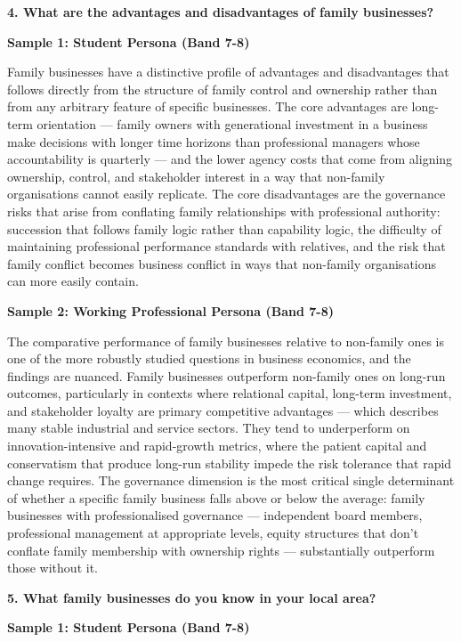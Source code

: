\separator

\begin{ieltsquestion}
\textbf{4. What are the advantages and disadvantages of family businesses?}
\end{ieltsquestion}
\textbf{Sample 1: Student Persona (Band 7-8)}

Family businesses have a distinctive profile of advantages and disadvantages that follows directly from the structure of family control and ownership rather than from any arbitrary feature of specific businesses. The core advantages are long-term orientation — family owners with generational investment in a business make decisions with longer time horizons than professional managers whose accountability is quarterly — and the lower agency costs that come from aligning ownership, control, and stakeholder interest in a way that non-family organisations cannot easily replicate. The core disadvantages are the governance risks that arise from conflating family relationships with professional authority: succession that follows family logic rather than capability logic, the difficulty of maintaining professional performance standards with relatives, and the risk that family conflict becomes business conflict in ways that non-family organisations can more easily contain.

\textbf{Sample 2: Working Professional Persona (Band 7-8)}

The comparative performance of family businesses relative to non-family ones is one of the more robustly studied questions in business economics, and the findings are nuanced. Family businesses outperform non-family ones on long-run outcomes, particularly in contexts where relational capital, long-term investment, and stakeholder loyalty are primary competitive advantages — which describes many stable industrial and service sectors. They tend to underperform on innovation-intensive and rapid-growth metrics, where the patient capital and conservatism that produce long-run stability impede the risk tolerance that rapid change requires. The governance dimension is the most critical single determinant of whether a specific family business falls above or below the average: family businesses with professionalised governance — independent board members, professional management at appropriate levels, equity structures that don't conflate family membership with ownership rights — substantially outperform those without it.

\separator

\begin{ieltsquestion}
\textbf{5. What family businesses do you know in your local area?}
\end{ieltsquestion}
\textbf{Sample 1: Student Persona (Band 7-8)}

